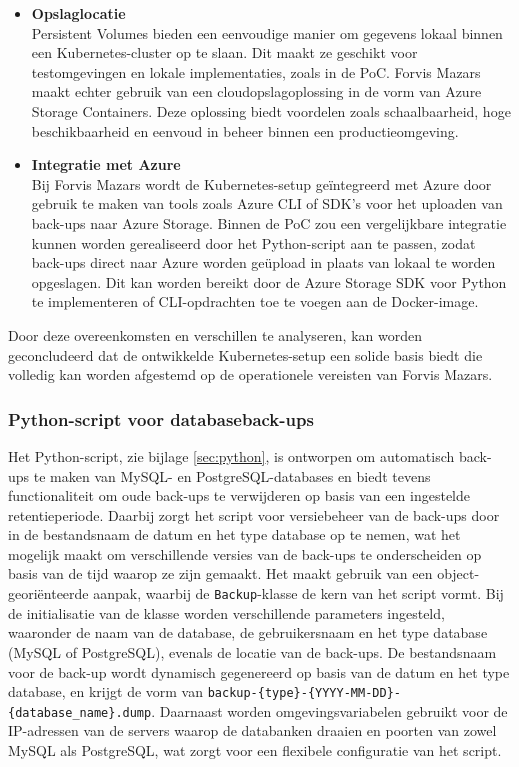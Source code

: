 \begin{itemize}
    \item \textbf{Opslaglocatie} \\
    Persistent Volumes bieden een eenvoudige manier om gegevens lokaal binnen een Kubernetes-cluster op te slaan. Dit maakt ze geschikt voor testomgevingen en lokale implementaties, zoals in de PoC. Forvis Mazars maakt echter gebruik van een cloudopslagoplossing in de vorm van Azure Storage Containers. Deze oplossing biedt voordelen zoals schaalbaarheid, hoge beschikbaarheid en eenvoud in beheer binnen een productieomgeving.
    
    \item \textbf{Integratie met Azure} \\
    Bij Forvis Mazars wordt de Kubernetes-setup geïntegreerd met Azure door gebruik te maken van tools zoals Azure CLI of SDK’s voor het uploaden van back-ups naar Azure Storage. Binnen de PoC zou een vergelijkbare integratie kunnen worden gerealiseerd door het Python-script aan te passen, zodat back-ups direct naar Azure worden geüpload in plaats van lokaal te worden opgeslagen. Dit kan worden bereikt door de Azure Storage SDK voor Python te implementeren of CLI-opdrachten toe te voegen aan de Docker-image.
\end{itemize}

Door deze overeenkomsten en verschillen te analyseren, kan worden geconcludeerd dat de ontwikkelde Kubernetes-setup een solide basis biedt die volledig kan worden afgestemd op de operationele vereisten van Forvis Mazars.

\subsubsection{Python-script voor databaseback-ups}
Het Python-script, zie bijlage \ref{sec:python}, is ontworpen om automatisch back-ups te maken van MySQL- en PostgreSQL-databases en biedt tevens functionaliteit om oude back-ups te verwijderen op basis van een ingestelde retentieperiode. Daarbij zorgt het script voor versiebeheer van de back-ups door in de bestandsnaam de datum en het type database op te nemen, wat het mogelijk maakt om verschillende versies van de back-ups te onderscheiden op basis van de tijd waarop ze zijn gemaakt.  Het maakt gebruik van een object-georiënteerde aanpak, waarbij de \texttt{Backup}-klasse de kern van het script vormt. Bij de initialisatie van de klasse worden verschillende parameters ingesteld, waaronder de naam van de database, de gebruikersnaam en het type database (MySQL of PostgreSQL), evenals de locatie van de back-ups. De bestandsnaam voor de back-up wordt dynamisch gegenereerd op basis van de datum en het type database, en krijgt de vorm van \texttt{backup-\{type\}-\{YYYY-MM-DD\}-\{database\_name\}.dump}. Daarnaast worden omgevingsvariabelen gebruikt voor de IP-adressen van de servers waarop de databanken draaien en poorten van zowel MySQL als PostgreSQL, wat zorgt voor een flexibele configuratie van het script.

